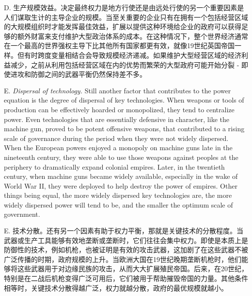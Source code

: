 \begin{Parallel}{97mm}{45mm}
  \ParallelRText
  {D. 生产规模效益。决定最终权力是地方行使还是由远处行使的另一个重要因素是人们谋取生计的主导企业的规模。当至关重要的企业只有在拥有一个包括经营区域的大规模组织时才能发挥最佳效益，扩展以提供这种环境给企业的政府可以获得足够的额外财富来支付维护大型政治体系的成本。在这种情况下，整个世界经济通常在一个最高的世界强权主导下比其他所有国家都更有效，就像19世纪英国帝国一样。但有时跨度变量相结合会导致规模经济递减。如果维护大型经营区域的经济利益减少，之前从利用包括经营区域在内的优势而繁荣的大型政府可能开始分裂 - 即使进攻和防御之间的武器平衡仍然保持差不多。}
  \ParallelPar


  \ParallelPar

  \ParallelLText
  {E. \emph{Dispersal of technology.} Still another factor that contributes to the power equation is the degree of dispersal of key technologies. When weapons or tools of production can be effectively hoarded or monopolized, they tend to centralize power. Even technologies that are essentially defensive in character, like the machine gun, proved to be potent offensive weapons, that contributed to a rising scale of governance during the period when they were not widely dispersed. When the European powers enjoyed a monopoly on machine guns late in the nineteenth century, they were able to use those weapons against peoples at the periphery to dramatically expand colonial empires. Later, in the twentieth century, when machine guns became widely available, especially in the wake of World War II, they were deployed to help destroy the power of empires. Other things being equal, the more widely dispersed key technologies are, the more widely dispersed power will tend to be, and the smaller the optimum scale of government.}
  
  \ParallelRText
  {E. 技术分散。还有另一个因素有助于权力平衡，那就是关键技术的分散程度。当武器或生产工具能够有效地垄断或垄断时，它们往往会集中权力。即使是本质上是防御性的技术，例如机枪，也被证明是有效的攻击武器，这加剧了在这些武器不被广泛传播的时期，政府规模的上升。当欧洲大国在19世纪晚期垄断机枪时，他们能够将这些武器用于对边缘民族的攻击，从而大大扩展殖民帝国。后来，在20世纪，特别是在二战后机枪变得广泛可用后，它们被用于帮助摧毁帝国的力量。其他条件相等时，关键技术分散得越广泛，权力就越分散，政府的最优规模就越小。}
  \ParallelPar


\end{Parallel}
